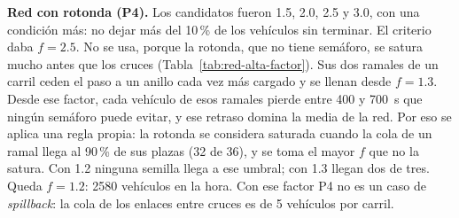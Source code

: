 \noindent\textbf{Red con rotonda (P4).} Los candidatos fueron 1.5, 2.0,
2.5 y 3.0, con una condición más: no dejar más del 10\,\% de los
vehículos sin terminar. El criterio daba $f = 2.5$. No se usa, porque
la rotonda, que no tiene semáforo, se satura mucho antes que los cruces
(Tabla~\ref{tab:red-alta-factor}). Sus dos ramales de un carril ceden
el paso a un anillo cada vez más cargado y se llenan desde $f = 1.3$.
Desde ese factor, cada vehículo de esos ramales pierde entre 400 y
700~s que ningún semáforo puede evitar, y ese retraso domina la media
de la red. Por eso se aplica una regla propia: la rotonda se considera saturada
cuando la cola de un ramal llega al 90\,\% de sus plazas (32 de 36), y
se toma el mayor $f$ que no la satura. Con 1.2 ninguna semilla llega a
ese umbral; con 1.3 llegan dos de tres. Queda $f = 1.2$: 2580 vehículos
en la hora. Con ese factor P4 no es un caso de \textit{spillback}: la
cola de los enlaces entre cruces es de 5 vehículos por carril.

